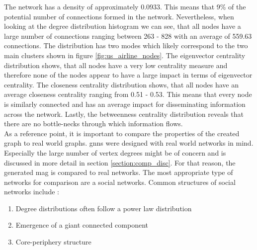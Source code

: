   \noindent The network has a density of approximately 0.0933. This means that 
  9\% of the potential number of connections formed in the network.
  Nevertheless, when looking at the degree distribution histogram we can see, 
  that all nodes have a large number of connections ranging between 263 -
  828 with an average of 559.63 connections. The distribution has two
  modes which likely correspond to the two main clusters shown in figure
  \ref{fig:us_airline_nodes}. The eigenvector centrality distribution shows, 
  that all nodes have a very low centrality measure and therefore none of the 
  nodes appear to have a large impact in terms of eigenvector centrality. The 
  closeness centrality distribution shows, that all nodes have an average 
  closeness centrality ranging from 0.51 - 0.53. This means that every node is 
  similarly connected and has an average impact for disseminating information 
  across the network. Lastly, the betweenness centrality distribution reveals 
  that there are no bottle-necks through which information flows. \\

  \noindent As a reference point, it is important to compare the properties of
  the created graph to real world graphs. \acsp{gnn} were designed with real
  world networks in mind. Especially the large number of vertex degrees might
  be of concern and is discussed in more detail in section 
  \ref{section:comp_disc}. For that reason, the generated \acs{mag} is
  compared to real networks. The most appropriate type of networks for comparison 
  are a social networks. Common structures of social networks include 
  \citep{watts1998collective,newman2006structure,Newman2010,kim2012multiplicative}:

  \begin{enumerate}
    \item Degree distributions often follow a power law distribution
    \item Emergence of a giant connected component
    \item Core-periphery structure
  \end{enumerate}

